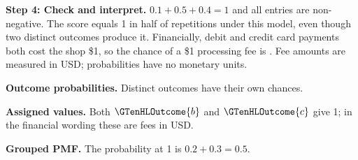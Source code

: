 \par\medskip
\par\noindent\begin{minipage}{\linewidth}
\textbf{Step 4: Check and interpret.} $0.1+0.5+0.4=1$ and all entries are non-negative. The score equals 1 in half of repetitions under this model, even though two distinct outcomes produce it. Financially, debit and credit card payments both cost the shop \$1, so the chance of a \$1 processing fee is . Fee amounts are measured in USD; probabilities have no monetary units.
\end{minipage}\par\medskip
\par\noindent \begin{minipage}[t]{.32\linewidth}
\centering
{}
\par\small \textbf{Outcome probabilities.} Distinct outcomes have their own chances.
\end{minipage}\hfill\begin{minipage}[t]{.32\linewidth}
\centering
{}
\par\small \textbf{Assigned values.} Both $\GTenHLOutcome{b}$ and $\GTenHLOutcome{c}$ give 1; in the financial wording these are fees in USD.
\end{minipage}\hfill\begin{minipage}[t]{.32\linewidth}
\centering
{}
\par\small \textbf{Grouped PMF.} The probability at 1 is $0.2+0.3=0.5$.
\end{minipage}\par\medskip


